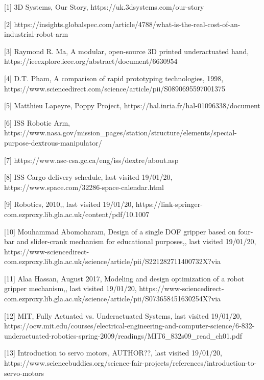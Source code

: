 \documentclass{l4proj}
\begin{document}






[1] 3D Systems, Our Story, https://uk.3dsystems.com/our-story

[2] https://insights.globalspec.com/article/4788/what-is-the-real-cost-of-an-industrial-robot-arm

[3] Raymond R. Ma, A modular, open-source 3D printed underactuated hand, https://ieeexplore.ieee.org/abstract/document/6630954

[4] D.T. Pham, A comparison of rapid prototyping technologies, 1998, https://www.sciencedirect.com/science/article/pii/S0890695597001375

[5] Matthieu Lapeyre, Poppy Project, https://hal.inria.fr/hal-01096338/document

[6] ISS Robotic Arm, https://www.nasa.gov/mission_pages/station/structure/elements/special-purpose-dextrous-manipulator/

[7] https://www.asc-csa.gc.ca/eng/iss/dextre/about.asp

[8] ISS Cargo delivery schedule, last visited 19/01/20, https://www.space.com/32286-space-calendar.html

[9] Robotics, 2010,, last visited 19/01/20, https://link-springer-com.ezproxy.lib.gla.ac.uk/content/pdf/10.1007%

[10] Mouhammad Abomoharam, Design of a single DOF gripper based on four-bar and slider-crank mechanism for educational purposes,, last visited 19/01/20, https://www-sciencedirect-com.ezproxy.lib.gla.ac.uk/science/article/pii/S221282711400732X?via%

[11] Alaa Hassan, August 2017, Modeling and design optimization of a robot gripper mechanism,, last visited 19/01/20, https://www-sciencedirect-com.ezproxy.lib.gla.ac.uk/science/article/pii/S073658451630254X?via%

[12] MIT, Fully Actuated vs. Underactuated Systems, last visited 19/01/20, https://ocw.mit.edu/courses/electrical-engineering-and-computer-science/6-832-underactuated-robotics-spring-2009/readings/MIT6_832s09_read_ch01.pdf

[13] Introduction to servo motors, AUTHOR??, last visited 19/01/20, https://www.sciencebuddies.org/science-fair-projects/references/introduction-to-servo-motors
\end{document}
